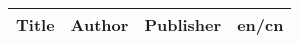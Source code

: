 \documentclass[a4paper,10pt,titlepage]{ctexart}
\title{}
\author{}
\date{\today}
\begin{document}
\begin{center}
\begin{longtable}{%
    | m{}<{\centering}
    | m{}<{\centering}
    | m{}<{\centering}
    | m{}<{\centering}
    |}
\hline
\textbf{Title} & \textbf{Author} & \textbf{Publisher} & \textbf{en/cn} \\
\hline


\end{longtable}
\end{center}
\end{document}
